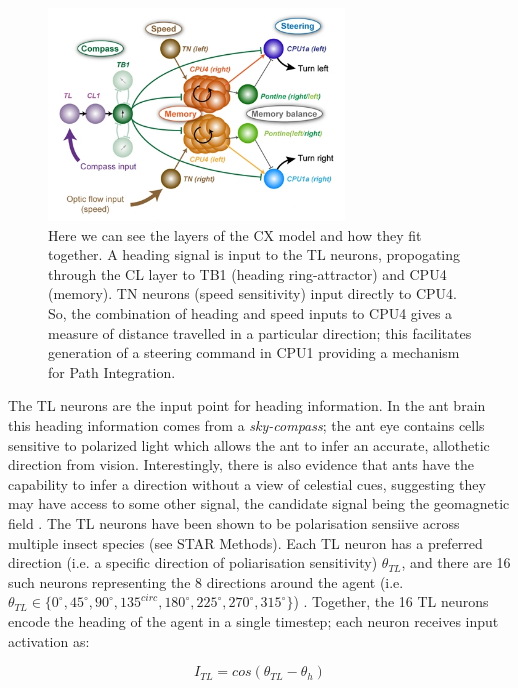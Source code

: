 \documentclass[a4paper,11pt,twoside,openright]{article}
\begin{document}
\begin{figure}[h!]
  \centering
  \includegraphics[width=0.7\textwidth]{Figure5F}
  \caption{
    \label{fig:cxlayer} Here we can see the layers of the CX model and
    how they fit together. A heading signal is input to the TL neurons,
    propogating through the CL layer to TB1 (heading ring-attractor) and
    CPU4 (memory). TN neurons (speed sensitivity) input directly to CPU4.
    So, the combination of heading and speed inputs to CPU4 gives a measure
    of distance travelled in a particular direction; this facilitates generation
    of a steering command in CPU1 providing a mechanism for Path Integration.
  }
\end{figure}

The TL neurons are the input point for heading information. In the ant brain
this heading information comes from a \textit{sky-compass}; the ant eye contains
cells sensitive to polarized light which allows the ant to infer an accurate,
allothetic direction from vision. Interestingly, there is also evidence that ants
have the capability to infer a direction without a view of celestial cues,
suggesting they may have access to some other signal, the candidate signal being
the geomagnetic field \cite{Fleischmann2018, Grob2017}. The TL neurons have been
shown to be polarisation sensiive across multiple insect species \cite{Stone2017}
(see STAR Methods). Each TL neuron has a preferred direction (i.e. a specific
direction of poliarisation sensitivity) $\theta_{TL}$, and there are 16 such
neurons representing the 8 directions around the agent (i.e.
$\theta_{TL} \in \{ 0^{\circ}, 45^{\circ}, 90^{\circ}, 135^{circ}, 180^{\circ},
225^{\circ}, 270^{\circ}, 315^{\circ}\} $) \cite{Stone2017}. Together, the 16
TL neurons encode the heading of the agent in a single timestep; each neuron
receives input activation as:

\begin{equation}
  I_{TL} = cos( \theta_{TL} - \theta_{h} )
\end{equation}
\end{document}
